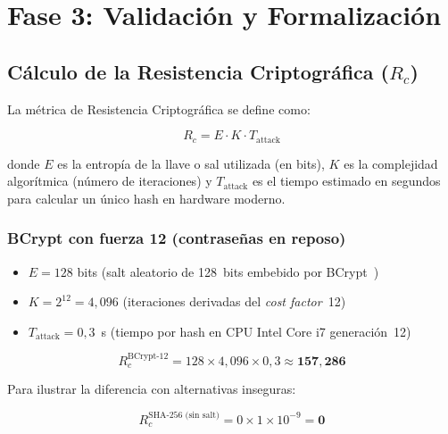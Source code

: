 \section*{Fase 3: Validación y Formalización}

\subsection*{Cálculo de la Resistencia Criptográfica ($R_c$)}

La métrica de Resistencia Criptográfica se define como:

\begin{equation}
    R_c = E \cdot K \cdot T_{\text{attack}}
    \label{eq:rc}
\end{equation}

donde $E$ es la entropía de la llave o sal utilizada (en bits), $K$ es la complejidad algorítmica
(número de iteraciones) y $T_{\text{attack}}$ es el tiempo estimado en segundos para calcular un
único hash en hardware moderno.

\subsubsection*{BCrypt con fuerza 12 (contraseñas en reposo)}

\begin{itemize}
    \item $E = 128$ bits \quad (salt aleatorio de 128~bits embebido por BCrypt~\cite{owasp2023})
    \item $K = 2^{12} = 4{,}096$ \quad (iteraciones derivadas del \textit{cost factor}~12)
    \item $T_{\text{attack}} = 0{,}3$~s \quad (tiempo por hash en CPU Intel Core i7 generación~12)
\end{itemize}

\begin{equation}
    R_c^{\text{BCrypt-12}} = 128 \times 4{,}096 \times 0{,}3 \approx \mathbf{157{,}286}
    \label{eq:rc_bcrypt}
\end{equation}

Para ilustrar la diferencia con alternativas inseguras:

\begin{equation}
    R_c^{\text{SHA-256 (sin salt)}} = 0 \times 1 \times 10^{-9} = \mathbf{0}
    \label{eq:rc_sha}
\end{equation}

